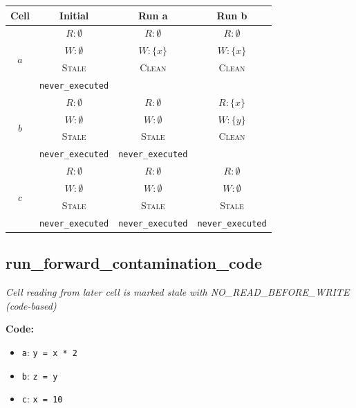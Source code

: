 \documentclass{article}
\begin{document}
\begin{center}
\small
\begin{tabular}{|c|c|c|c|}
\hline
\textbf{Cell} & \textbf{Initial} & \textbf{Run a} & \textbf{Run b} \\
\hline
\multirow{4}{*}{$a$}
  & $R: \emptyset$ & $R: \emptyset$ & $R: \emptyset$ \\
  & $W: \emptyset$ & $W: \{x\}$ & $W: \{x\}$ \\
  & \textsc{Stale} & \textsc{Clean} & \textsc{Clean} \\
  & \footnotesize\texttt{never\_executed} &  &  \\
\hline
\multirow{4}{*}{$b$}
  & $R: \emptyset$ & $R: \emptyset$ & $R: \{x\}$ \\
  & $W: \emptyset$ & $W: \emptyset$ & $W: \{y\}$ \\
  & \textsc{Stale} & \textsc{Stale} & \textsc{Clean} \\
  & \footnotesize\texttt{never\_executed} & \footnotesize\texttt{never\_executed} &  \\
\hline
\multirow{4}{*}{$c$}
  & $R: \emptyset$ & $R: \emptyset$ & $R: \emptyset$ \\
  & $W: \emptyset$ & $W: \emptyset$ & $W: \emptyset$ \\
  & \textsc{Stale} & \textsc{Stale} & \textsc{Stale} \\
  & \footnotesize\texttt{never\_executed} & \footnotesize\texttt{never\_executed} & \footnotesize\texttt{never\_executed} \\
\hline
\end{tabular}
\end{center}


\subsection{run\_forward\_contamination\_code}
\textit{Cell reading from later cell is marked stale with NO\_READ\_BEFORE\_WRITE (code-based)}

\textbf{Code:}
\begin{itemize}
  \item \texttt{a}: \verb|y = x * 2|
  \item \texttt{b}: \verb|z = y|
  \item \texttt{c}: \verb|x = 10|
\end{itemize}
\end{document}
